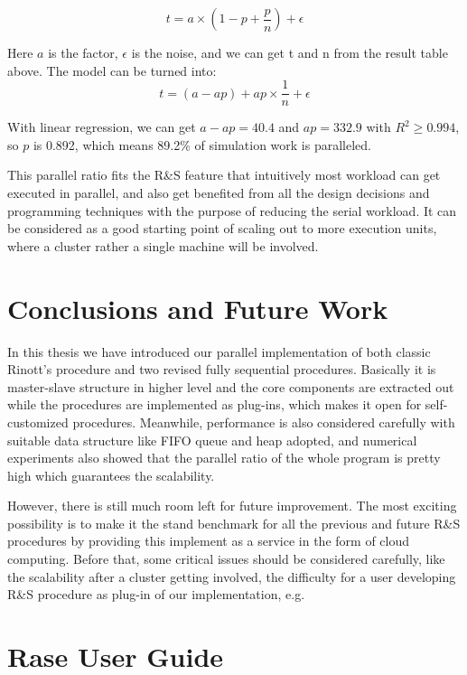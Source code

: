 \documentclass[12pt,a4]{report}
\begin{document}
$$ t = a \times (1 - p + \frac{p}{n}) + \epsilon $$

Here $a$ is the factor, $\epsilon$ is the noise, and we can get t and n from the result table above. The model can be turned into: 
$$ t = (a - ap) + ap \times \frac{1}{n} + \epsilon $$

With linear regression, we can get $a - ap = 40.4$ and $ap = 332.9$ with $R^2 \geqslant 0.994$, so $p$ is 0.892, which means 89.2\% of simulation work is paralleled.

This parallel ratio fits the R\&S feature that intuitively most workload can get executed in parallel, and also get benefited from all the design decisions and programming techniques with the purpose of reducing the serial workload. It can be considered as a good starting point of scaling out to more execution units, where a cluster rather a single machine will be involved.

\chapter{Conclusions and Future Work}

In this thesis we have introduced our parallel implementation of both classic Rinott's procedure and two revised fully sequential procedures. Basically it is master-slave structure in higher level and the core components are extracted out while the procedures are implemented as plug-ins, which makes it open for self-customized procedures. Meanwhile, performance is also considered carefully with suitable data structure like FIFO queue and heap adopted, and numerical experiments also showed that the parallel ratio of the whole program is pretty high which guarantees the scalability.

However, there is still much room left for future improvement. The most exciting possibility is to make it the stand benchmark for all the previous and future R\&S procedures by providing this implement as a service in the form of cloud computing. Before that, some critical issues should be considered carefully, like the scalability after a cluster getting involved, the difficulty for a user developing R\&S procedure as plug-in of our implementation, e.g.

\newpage
{}
\appendix


\chapter{Rase User Guide}
\end{document}
